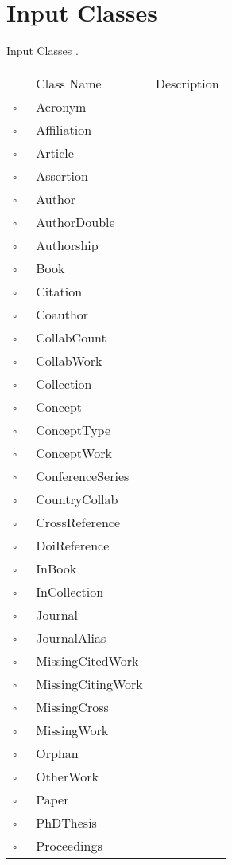 \chapter{Input Classes}
Input Classes     .
\begin{longtable}{llp{8cm}}
& Class Name & Description \\
$\square$\ & Acronym &  \\
$\square$\ & Affiliation &  \\
$\square$\ & Article &  \\
$\square$\ & Assertion &  \\
$\square$\ & Author &  \\
$\square$\ & AuthorDouble &  \\
$\square$\ & Authorship &  \\
$\square$\ & Book &  \\
$\square$\ & Citation &  \\
$\square$\ & Coauthor &  \\
$\square$\ & CollabCount &  \\
$\square$\ & CollabWork &  \\
$\square$\ & Collection &  \\
$\square$\ & Concept &  \\
$\square$\ & ConceptType &  \\
$\square$\ & ConceptWork &  \\
$\square$\ & ConferenceSeries &  \\
$\square$\ & CountryCollab &  \\
$\square$\ & CrossReference &  \\
$\square$\ & DoiReference &  \\
$\square$\ & InBook &  \\
$\square$\ & InCollection &  \\
$\square$\ & Journal &  \\
$\square$\ & JournalAlias &  \\
$\square$\ & MissingCitedWork &  \\
$\square$\ & MissingCitingWork &  \\
$\square$\ & MissingCross &  \\
$\square$\ & MissingWork &  \\
$\square$\ & Orphan &  \\
$\square$\ & OtherWork &  \\
$\square$\ & Paper &  \\
$\square$\ & PhDThesis &  \\
$\square$\ & Proceedings &  \\

\end{longtable}
